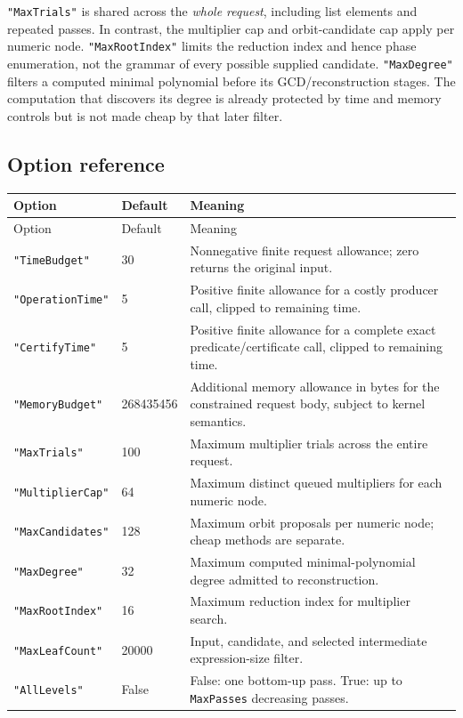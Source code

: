 \documentclass[11pt,letterpaper]{article}
\newcommand{\code}[1]{\texttt{#1}}
\theoremstyle{definition}
\begin{document}
\code{"MaxTrials"} is shared across the \emph{whole request}, including list elements and repeated passes. In contrast, the multiplier cap and orbit-candidate cap apply per numeric node. \code{"MaxRootIndex"} limits the reduction index and hence phase enumeration, not the grammar of every possible supplied candidate. \code{"MaxDegree"} filters a computed minimal polynomial before its GCD/reconstruction stages. The computation that discovers its degree is already protected by time and memory controls but is not made cheap by that later filter.

\subsection{Option reference}

\begin{longtable}{@{}p{}p{}p{}@{}}
\toprule Option & Default & Meaning\\\midrule\endfirsthead
\toprule Option & Default & Meaning\\\midrule\endhead\bottomrule\endfoot
\code{"TimeBudget"} & 30 & Nonnegative finite request allowance; zero returns the original input.\\
\code{"OperationTime"} & 5 & Positive finite allowance for a costly producer call, clipped to remaining time.\\
\code{"CertifyTime"} & 5 & Positive finite allowance for a complete exact predicate/certificate call, clipped to remaining time.\\
\code{"MemoryBudget"} & 268435456 & Additional memory allowance in bytes for the constrained request body, subject to kernel semantics.\\
\code{"MaxTrials"} & 100 & Maximum multiplier trials across the entire request.\\
\code{"MultiplierCap"} & 64 & Maximum distinct queued multipliers for each numeric node.\\
\code{"MaxCandidates"} & 128 & Maximum orbit proposals per numeric node; cheap methods are separate.\\
\code{"MaxDegree"} & 32 & Maximum computed minimal-polynomial degree admitted to reconstruction.\\
\code{"MaxRootIndex"} & 16 & Maximum reduction index for multiplier search.\\
\code{"MaxLeafCount"} & 20000 & Input, candidate, and selected intermediate expression-size filter.\\
\code{"AllLevels"} & False & False: one bottom-up pass. True: up to \code{MaxPasses} decreasing passes.\\

\end{longtable}
\end{document}
